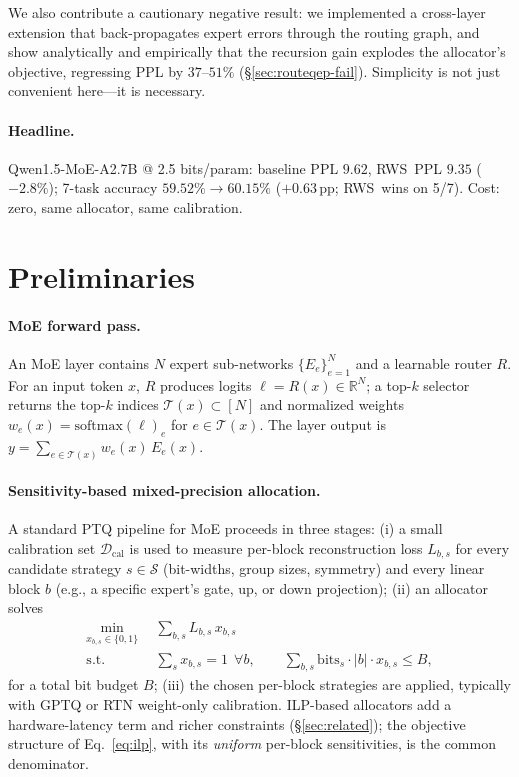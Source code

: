 \documentclass{article}
\newcommand{\method}{\textsc{RWS}\xspace}
\begin{document}
We also contribute a cautionary negative result: we implemented a cross-layer extension that back-propagates expert errors through the routing graph, and show analytically and empirically that the recursion gain explodes the allocator's objective, regressing PPL by $37$--$51\%$ (\S\ref{sec:routeqep-fail}). Simplicity is not just convenient here---it is necessary.

\paragraph{Headline.} Qwen1.5-MoE-A2.7B @ 2.5 bits/param: baseline PPL $9.62$, \method\ PPL $9.35$ ($-2.8\%$); 7-task accuracy $59.52\% \to 60.15\%$ ($+0.63$\,pp; \method\ wins on 5/7). Cost: zero, same allocator, same calibration.

\section{Preliminaries}
\label{sec:background}

\paragraph{MoE forward pass.} An MoE layer contains $N$ expert sub-networks $\{E_e\}_{e=1}^N$ and a learnable router $R$. For an input token $x$, $R$ produces logits $\ell = R(x) \in \mathbb{R}^N$; a top-$k$ selector returns the top-$k$ indices $\mathcal{T}(x) \subset [N]$ and normalized weights $w_e(x) = \mathrm{softmax}(\ell)_e$ for $e \in \mathcal{T}(x)$. The layer output is $y = \sum_{e \in \mathcal{T}(x)} w_e(x)\, E_e(x)$.

\paragraph{Sensitivity-based mixed-precision allocation.} A standard PTQ pipeline for MoE proceeds in three stages: (i) a small calibration set $\mathcal{D}_{\text{cal}}$ is used to measure per-block reconstruction loss $L_{b,s}$ for every candidate strategy $s \in \mathcal{S}$ (bit-widths, group sizes, symmetry) and every linear block $b$ (e.g., a specific expert's gate, up, or down projection); (ii) an allocator solves
\begin{align}
\label{eq:ilp}
\min_{x_{b,s} \in \{0,1\}} \ \ & \sum_{b,s} L_{b,s}\, x_{b,s} \\
\text{s.t.}\quad & \sum_{s} x_{b,s} = 1 \ \ \forall b, \qquad \sum_{b,s} \mathrm{bits}_s \cdot |b| \cdot x_{b,s} \le B, \nonumber
\end{align}
for a total bit budget $B$; (iii) the chosen per-block strategies are applied, typically with GPTQ or RTN weight-only calibration. ILP-based allocators add a hardware-latency term and richer constraints (\S\ref{sec:related}); the objective structure of Eq.~\ref{eq:ilp}, with its \emph{uniform} per-block sensitivities, is the common denominator.
\end{document}
